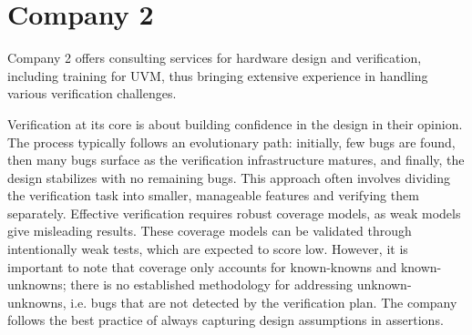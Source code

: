 \section{Company 2} %

Company 2 offers consulting services for hardware design and verification, including training for UVM, thus bringing
extensive experience in handling various verification challenges.

Verification at its core is about building confidence in the design in their opinion. The process typically follows
an evolutionary path: initially, few bugs are found, then many bugs surface as the verification infrastructure
matures, and finally, the design stabilizes with no remaining bugs. This approach often involves dividing the
verification task into smaller, manageable features and verifying them separately. Effective verification requires
robust coverage models, as weak models give misleading results. These coverage models can be validated through
intentionally weak tests, which are expected to score low. However, it is important to note that coverage only
accounts for known-knowns and known-unknowns; there is no established methodology for addressing unknown-unknowns,
i.e. bugs that are not detected by the verification plan. The company follows the best practice of always capturing
design assumptions in assertions.

